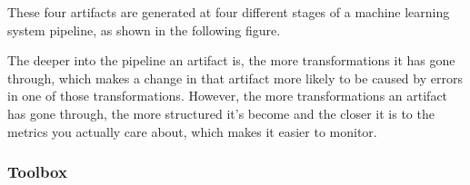 These four artifacts are generated at four different stages of a machine learning system pipeline, as shown in the
following figure.


The deeper into the pipeline an artifact is, the more transformations it has gone through, which makes a change in
that artifact more likely to be caused by errors in one of those transformations. However, the more transformations
an artifact has gone through, the more structured it's become and the closer it is to the metrics you actually care
about, which makes it easier to monitor.

\subsubsection{Toolbox}

